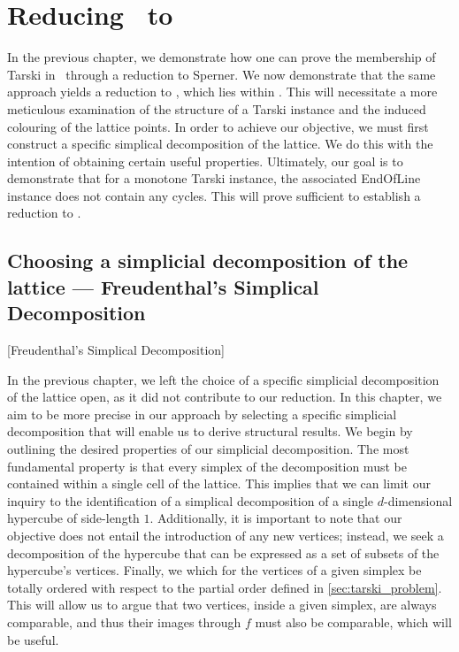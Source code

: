 \setchapterpreamble[u]{\margintoc}
\chapter{Reducing \Tarski\ to \EOPL}

In the previous chapter, we demonstrate how one can prove the membership of Tarski in \PPAD\ through a reduction to Sperner. We now demonstrate that the same approach yields a reduction to \EndOfPotentialLine, which lies within \EOPL. This will necessitate a more meticulous examination of the structure of a Tarski instance and the induced colouring of the lattice points. In order to achieve our objective, we must first construct a specific simplical decomposition of the lattice. We do this with the intention of obtaining certain useful properties. Ultimately, our goal is to demonstrate that for a monotone Tarski instance, the associated EndOfLine instance does not contain any cycles. This will prove sufficient to establish a reduction to \EndOfPotentialLine.

\section{Choosing a simplicial decomposition of the lattice --- Freudenthal's Simplical Decomposition}[Freudenthal's Simplical Decomposition]
\label{sec:freudenthal_simplicial_decomposition}

In the previous chapter, we left the choice of a specific simplicial decomposition of the lattice open, as it did not contribute to our reduction. In this chapter, we aim to be more precise in our approach by selecting a specific simplicial decomposition that will enable us to derive structural results. We begin by outlining the desired properties of our simplicial decomposition. The most fundamental property is that every simplex of the decomposition must be contained within a single cell of the lattice. This implies that we can limit our inquiry to the identification of a simplical decomposition of a single $d$-dimensional hypercube of side-length $1$. Additionally, it is important to note that our objective does not entail the introduction of any new vertices; instead, we seek a decomposition of the hypercube that can be expressed as a set of subsets of the hypercube's vertices.	Finally, we which for the vertices of a given simplex be totally ordered with respect to the partial order defined in \cref{sec:tarski_problem}. This will allow us to argue that two vertices, inside a given simplex, are always comparable, and thus their images through $f$ must also be comparable, which will be useful.

